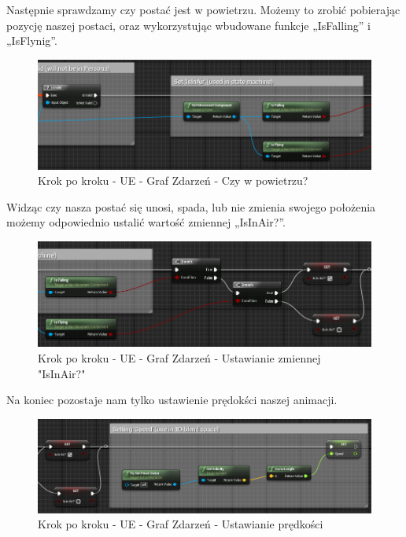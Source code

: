 \documentclass[12pt]{xmgr}
\begin{document}
Następnie sprawdzamy czy postać jest w powietrzu. Możemy to zrobić pobierając pozycję naszej postaci, oraz wykorzystując wbudowane funkcje „IsFalling” i „IsFlynig”.

\begin{figure}[!htb]
    \begin{center}
    \includegraphics[scale=0.6]{Screeny/UeKrokPoKroku/UE-EventGraph-IsInAir.png}
    \end{center}
    \caption{Krok po kroku - UE -  Graf Zdarzeń - Czy w powietrzu?}
\end{figure}

Widząc czy nasza postać się unosi, spada, lub nie zmienia swojego położenia możemy odpowiednio ustalić wartość zmiennej „IsInAir?”.

\begin{figure}[!htb]
    \begin{center}
    \includegraphics[scale=0.6]{Screeny/UeKrokPoKroku/UE-EventGraph-SetIsInAir.png}
    \end{center}
    \caption{Krok po kroku - UE -  Graf Zdarzeń - Ustawianie zmiennej "IsInAir?"}
\end{figure}

\newpage
Na koniec pozostaje nam tylko ustawienie prędokści naszej animacji.

\begin{figure}[!htb]
    \begin{center}
    \includegraphics[scale=0.6]{Screeny/UeKrokPoKroku/UE-EventGraph-Speed.png}
    \end{center}
    \caption{Krok po kroku - UE -  Graf Zdarzeń - Ustawianie prędkości}
\end{figure}
\end{document}
